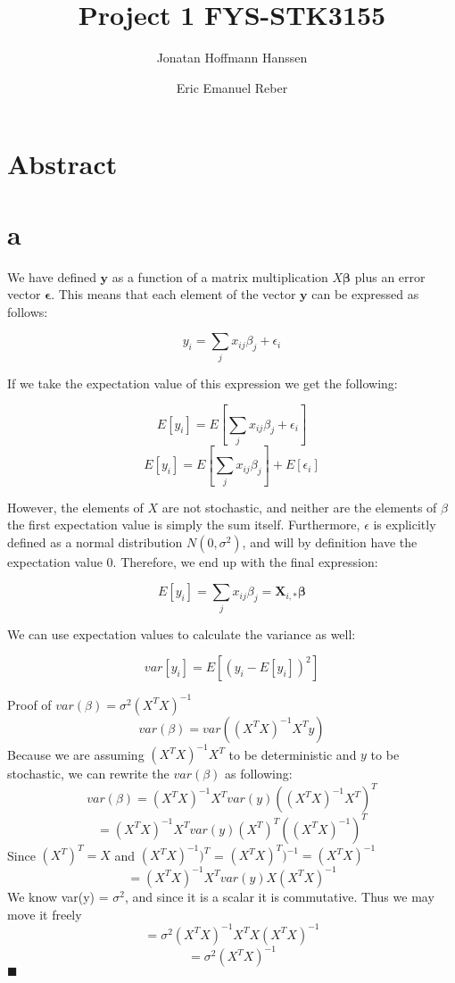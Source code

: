 \documentclass{article}
\author{Jonatan Hoffmann Hanssen \and Eric Emanuel Reber}
\title{Project 1 FYS-STK3155}
\begin{document}
	\maketitle

\section*{Abstract}

\section*{a}

We have defined $\bm{y}$ as a function of a matrix multiplication $X\bm{\beta}$
plus an error vector $\bm{\epsilon}$. This means that each element of the vector
$\bm{y}$ can be expressed as follows:

\[ y_i = \sum_j x_{ij}\beta_j + \epsilon_i \]

If we take the expectation value of this expression we get the following:

\[ E[y_i] = E\left[\sum_j x_{ij}\beta_j + \epsilon_i\right] \]
\[ E[y_i] = E\left[\sum_j x_{ij}\beta_j\right] + E[\epsilon_i] \]

However, the elements of $X$ are not stochastic, and neither are the elements of $\beta$
the first expectation value is simply the sum itself. Furthermore, $\epsilon$ is 
explicitly defined as a normal distribution $N(0,\sigma^2)$, and will by definition have
the expectation value $0$. Therefore, we end up with the final expression:

\[ E[y_i] = \sum_j x_{ij}\beta_j = \bm{X}_{i,*}\bm{\beta}\]

We can use expectation values to calculate the variance as well:

\[ var[y_i] = E\left[(y_i - E[y_i])^2\right] \]

Proof of $var(\beta) = \sigma^{2}(X^{T}X)^{-1}$
$$var(\beta) = var((X^{T}X)^{-1}X^{T}y)$$
Because we are assuming $(X^{T}X)^{-1}X^{T}$ to be deterministic and $y$ to be stochastic, we can rewrite the $var(\beta)$ as following:
$$var(\beta) = (X^{T}X)^{-1}X^{T}var(y)((X^{T}X)^{-1}X^{T})^{T}$$
$$ = (X^{T}X)^{-1}X^{T}var(y)(X^{T})^{T}((X^{T}X)^{-1})^{T}$$
Since $(X^{T})^{T} = X$ and $(X^{T}X)^{-1})^{T}$ = $(X^{T}X)^{T})^{-1} = (X^{T}X)^{-1}$
$$ = (X^{T}X)^{-1}X^{T}var(y)X(X^{T}X)^{-1} $$
We know var(y) = $\sigma^{2}$, and since it is a scalar it is commutative. Thus we may move it freely
$$ = \sigma^{2}(X^{T}X)^{-1}X^{T}X(X^{T}X)^{-1} $$
$$ = \sigma^{2}(X^{T}X)^{-1} $$
$\blacksquare$
\end{document}
